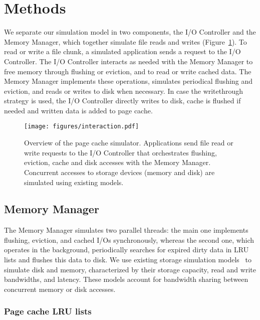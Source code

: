 \documentclass[conference]{IEEEtran}
\begin{document}
    \section{Methods}
    \label{method}
    We separate our simulation model in two components, the I/O
    Controller and the Memory Manager, which together simulate
    file reads and writes (Figure~\ref{fig:interaction}).
    To read or write a file chunk, a simulated application sends a
    request to the I/O Controller. The I/O Controller interacts as needed with
    the Memory Manager to free memory through flushing or eviction,
    and to read or write cached data. The Memory Manager
    implements these operations, simulates periodical flushing
    and eviction, and reads or writes to disk when necessary.
    In case the writethrough strategy is used, the I/O Controller directly writes to disk, 
    cache is flushed if needed and written data is added to page cache.

    \begin{figure}
           \centering
           \texttt{[image: figures/interaction.pdf]}
           \caption{Overview of the page cache simulator.
           Applications send file read or write requests to the
           I/O Controller that orchestrates flushing, eviction, cache
           and disk accesses with the Memory Manager. Concurrent accesses to storage
           devices (memory and disk) are simulated using existing models.}
           \label{fig:interaction}
    \end{figure}

    \subsection{Memory Manager}

    The Memory Manager simulates two parallel threads: the main one
    implements flushing, eviction, and cached I/Os synchronously, whereas
    the second one, which operates in the background, periodically searches for
    expired dirty data in LRU lists and flushes this data to disk. We
    use existing storage simulation models~\cite{lebre2015} to simulate disk and
    memory, characterized by their storage capacity, read and write
    bandwidths, and latency. These models account for
    bandwidth sharing between concurrent memory or disk accesses.

    \subsubsection{Page cache LRU lists}
\end{document}

